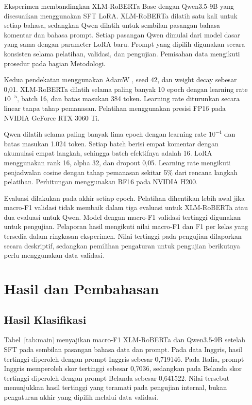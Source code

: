 \documentclass[11pt]{article}
\begin{document}
Eksperimen membandingkan XLM-RoBERTa Base dengan Qwen3.5-9B yang disesuaikan menggunakan SFT LoRA. XLM-RoBERTa dilatih satu kali untuk setiap bahasa, sedangkan Qwen dilatih untuk sembilan pasangan bahasa komentar dan bahasa prompt. Setiap pasangan Qwen dimulai dari model dasar yang sama dengan parameter LoRA baru. Prompt yang dipilih digunakan secara konsisten selama pelatihan, validasi, dan pengujian. Pemisahan data mengikuti prosedur pada bagian Metodologi.

Kedua pendekatan menggunakan AdamW \citep{loshchilov-hutter-2019-decoupled}, seed 42, dan weight decay sebesar 0,01. XLM-RoBERTa dilatih selama paling banyak 10 epoch dengan learning rate $10^{-5}$, batch 16, dan batas masukan 384 token. Learning rate diturunkan secara linear tanpa tahap pemanasan. Pelatihan menggunakan presisi FP16 pada NVIDIA GeForce RTX 3060 Ti.

Qwen dilatih selama paling banyak lima epoch dengan learning rate $10^{-4}$ dan batas masukan 1.024 token. Setiap batch berisi empat komentar dengan akumulasi empat langkah, sehingga batch efektifnya adalah 16. LoRA menggunakan rank 16, alpha 32, dan dropout 0,05. Learning rate mengikuti penjadwalan cosine dengan tahap pemanasan sekitar 5\% dari rencana langkah pelatihan. Perhitungan menggunakan BF16 pada NVIDIA H200.

Evaluasi dilakukan pada akhir setiap epoch. Pelatihan dihentikan lebih awal jika macro-F1 validasi tidak membaik dalam tiga evaluasi untuk XLM-RoBERTa atau dua evaluasi untuk Qwen. Model dengan macro-F1 validasi tertinggi digunakan untuk pengujian. Pelaporan hasil mengikuti nilai macro-F1 dan F1 per kelas yang tersedia dalam ringkasan eksperimen. Nilai tertinggi pada pengujian dilaporkan secara deskriptif, sedangkan pemilihan pengaturan untuk pengujian berikutnya perlu menggunakan data validasi.

\section{Hasil dan Pembahasan}
\subsection{Hasil Klasifikasi}
Tabel~\ref{tab:main} menyajikan macro-F1 XLM-RoBERTa dan Qwen3.5-9B setelah SFT pada sembilan pasangan bahasa data dan prompt. Pada data Inggris, hasil tertinggi diperoleh dengan prompt Inggris sebesar 0,719146. Pada Italia, prompt Inggris memperoleh skor tertinggi sebesar 0,7036, sedangkan pada Belanda skor tertinggi diperoleh dengan prompt Belanda sebesar 0,641522. Nilai tersebut menunjukkan hasil tertinggi yang teramati pada pengujian internal, bukan pengaturan akhir yang dipilih melalui data validasi.
\end{document}

